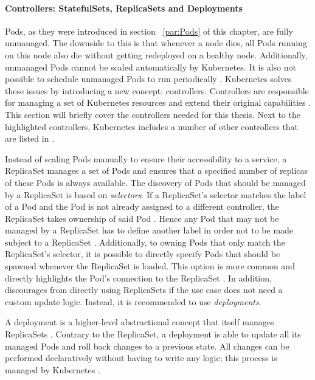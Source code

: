 \paragraph{Controllers: StatefulSets, ReplicaSets and Deployments}%
\label{par:Controllers}
Pods, as they were introduced in section ~\ref{par:Pods} of this chapter,
are fully unmanaged. The downside to this is that whenever a node dies, all
Pods running on this node also die without getting redeployed on a healthy
node. Additionally, unmanaged Pods cannot be scaled automatically by
Kubernetes. It is also not possible to schedule unmanaged Pods to run
periodically \autocite[Ch. 4]{LuksaKubernetesAction2017}. Kubernetes solves
these issues by introducing a new concept: controllers. Controllers are
responsible for managing a set of Kubernetes resources and extend their
original capabilities \autocite{AuthorsConcepts2019}. This section will briefly
cover the controllers needed for this thesis. Next to the highlighted
controllers, Kubernetes includes a number of other controllers that are listed
in \autocite{AuthorsConcepts2019}.

Instead of scaling Pods manually to ensure their accessibility to a service, a
ReplicaSet manages a set of Pods and ensures that a specified number of
replicas of these Pods is always available. The discovery of Pods that should
be managed by a ReplicaSet is based on \textit{selectors}. If a ReplicaSet's
selector matches the label of a Pod and the Pod is not already assigned to a
different controller, the ReplicaSet takes ownership of said Pod \autocite[Ch.
4]{LuksaKubernetesAction2017}. Hence any Pod that may not be managed by a
ReplicaSet has to define another label in order not to be made subject to a
ReplicaSet \autocite{AuthorsReplicaSet2019}. Additionally, to owning Pods that
only match the ReplicaSet's selector, it is possible to directly specify Pods
that should be spawned whenever the ReplicaSet is loaded. This option is more
common and directly highlights the Pod's connection to the ReplicaSet
\autocite{AuthorsReplicaSet2019}. In addition, \autocite{AuthorsReplicaSet2019}
discourages from directly using ReplicaSets if the use case does not need a
custom update logic. Instead, it is recommended to use \textit{deployments}.

A deployment is a higher-level abstractional concept that itself manages
ReplicaSets \autocite{AuthorsReplicaSet2019}. Contrary to the ReplicaSet, a
deployment is able to update all its managed Pods and roll back changes to a
previous state. All changes can be performed declaratively without having to
write any logic; this process is managed by Kubernetes \autocite[Ch.
9]{LuksaKubernetesAction2017}.

